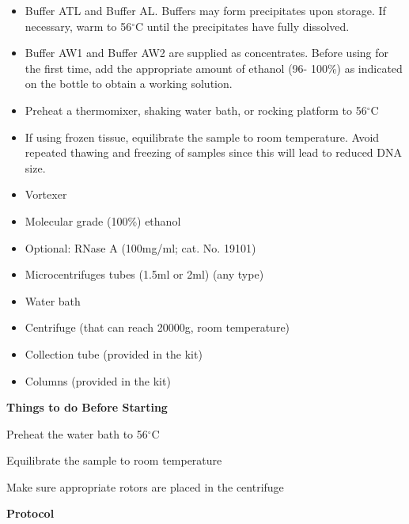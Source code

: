\documentclass[11pt, oneside]{article}
\begin{document}
		\begin{itemize}
		\itemsep0em
			\item Buffer ATL and Buffer AL. Buffers may form precipitates upon storage. If necessary, warm to 56$^{\circ}$C until the precipitates have 			fully dissolved.
			\item Buffer AW1 and Buffer AW2 are supplied as concentrates. Before using for the first time, add the appropriate amount of ethanol (96-			100\%) as indicated on the bottle to obtain a working solution.
			\item Preheat a thermomixer, shaking water bath, or rocking platform to 56$^{\circ}$C
			\item If using frozen tissue, equilibrate the sample to room temperature. Avoid repeated thawing and freezing of samples since this will lead 			to reduced DNA size.
			\item Vortexer
			\item Molecular grade (100\%) ethanol
			\item Optional: RNase A (100mg/ml; cat. No. 19101)
			\item Microcentrifuges tubes (1.5ml or 2ml) (any type)
			\item Water bath
			\item Centrifuge (that can reach 20000g, room temperature)
			\item Collection tube (provided in the kit)
			\item Columns (provided in the kit)
		\end{itemize}

		\vspace{5mm}

		{\bf Things to do Before Starting}

		Preheat the water bath to 56$^{\circ}$C

		Equilibrate the sample to room temperature
		
		Make sure appropriate rotors are placed in the centrifuge
		
		\vspace{5mm}

		{\bf Protocol}
\end{document}
